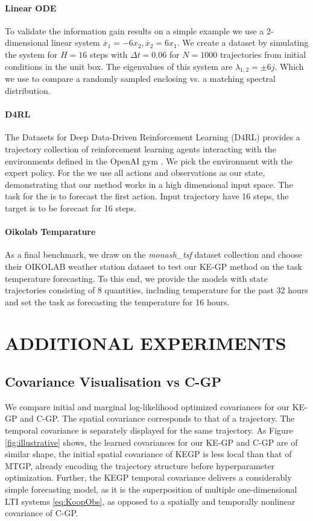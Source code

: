 \paragraph{Linear ODE}
To validate the information gain results on a simple example we use a 2-dimensional linear system $\dot{x_1}=-6 x_2, \dot{x_2}=6x_1$. We create a dataset by simulating the system for $H=16$ steps with $\Delta t=0.06$ for $N=1000$ trajectories from initial conditions in the unit box. The eigenvalues of this system are $\lambda_{1,2}=\pm 6j$. Which we use to compare a randomly sampled enclosing vs. a matching spectral distribution.

\paragraph{D4RL}
 The Datasets for Deep Data-Driven Reinforcement Learning (D4RL) \citep{fu2020d4rl} provides a trajectory collection of reinforcement learning agents interacting with the environments defined in the OpenAI gym  \citep{oAIgym}. We pick the environment  with the expert policy. For the  we use all actions and observations as our state, demonstrating that our method works in a high dimensional input space. The task for the  is to forecast the first action. Input trajectory have 16 steps, the target is to be forecast for 16 steps.
 
\paragraph{Oikolab Temparature}
As a final benchmark, we draw on the \emph{monash\_tsf} dataset collection \citep{godahewa2021monash} and choose their OIKOLAB weather station dataset to test our KE-GP method on the task temperature forecasting. To this end, we provide the models with state trajectories consisting of 8 quantities, including temperature for the past 32 hours and set the task as forecasting the temperature for 16 hours.

\section{ADDITIONAL EXPERIMENTS}\label{supl:AddExp}

\subsection{Covariance Visualisation vs C-GP}\label{sec:covvis}
We compare initial and marginal log-likelihood optimized covariances for our KE-GP and C-GP. The spatial covariance corresponds to that of a trajectory. The temporal covariance is separately displayed for the same trajectory. As Figure \ref{fig:illustrative} shows, the learned covariances for our KE-GP and C-GP are of similar shape, the initial spatial covariance of KEGP is less local than that of MTGP, already encoding the trajectory structure before hyperparameter optimization. Further, the KEGP temporal covariance delivers a considerably simple forecasting model, as it is the superposition of multiple one-dimensional LTI systems \eqref{eq:KoopObs}, as opposed to a spatially and temporally nonlinear covariance of C-GP. 

